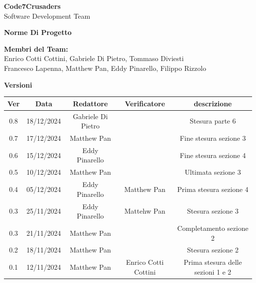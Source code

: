 \documentclass{article}
\begin{document}
\begin{titlepage}
    \vspace{1cm}
    
    {\Huge \textbf{Code7Crusaders}}\\
    \vspace{0.5cm}
    {\Large Software Development Team}\\
    \vspace{2cm}
    
    \large \textbf{Norme Di Progetto}
    \vspace{3.9cm}

    \textbf{Membri del Team:}\\
    Enrico Cotti Cottini, Gabriele Di Pietro, Tommaso Diviesti \\
    Francesco Lapenna, Matthew Pan, Eddy Pinarello, Filippo Rizzolo \\
    \vspace{0.5cm}
    
    \vspace{1cm}
\end{titlepage}



\newpage
\begin{center}
    \textbf{Versioni}
    \\
    \vspace{0.3cm}
    \begin{tabular}{|c|c|c|c|c|}
        \hline
        \textbf{Ver} & \textbf{Data} & \textbf{Redattore} & \textbf{Verificatore} & \textbf{descrizione}\\
        \hline
        0.8 & 18/12/2024 & Gabriele Di Pietro &               & Stesura parte 6 \\ 
        0.7 & 17/12/2024 & Matthew Pan &                      & Fine stesura sezione 3\\
        0.6 & 15/12/2024 & Eddy Pinarello &                   & Fine stesura sezione 4\\
        0.5 & 10/12/2024 & Matthew Pan &                      & Ultimata sezione 3\\
        0.4 & 05/12/2024 & Eddy Pinarello & Matthew Pan       & Prima stesura sezione 4\\
        0.3 & 25/11/2024 & Eddy Pinarello & Mattehw Pan       & Stesura sezione 3\\
        0.3 & 21/11/2024 & Matthew Pan &                      & Completamento sezione 2\\
        0.2 & 18/11/2024 & Matthew Pan &                      & Stesura sezione 2\\
        0.1 & 12/11/2024 & Matthew Pan & Enrico Cotti Cottini & Prima stesura delle sezioni 1 e 2\\
        \hline
    \end{tabular}
\end{center}
\end{document}
